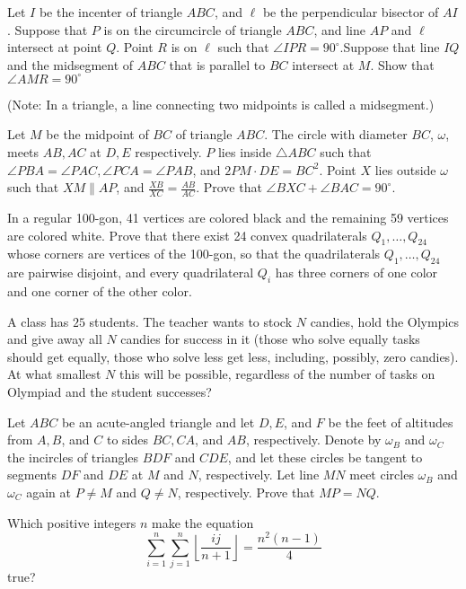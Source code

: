 \documentclass[11pt]{scrartcl}
\begin{document}
\begin{problem}[908587245178389]
Let $I$ be the incenter of triangle $ABC$, and $\ell$ be the perpendicular bisector of $AI$. Suppose that $P$ is on the circumcircle of triangle $ABC$, and line $AP$ and $\ell$ intersect at point $Q$. Point $R$ is on $\ell$ such that $\angle IPR = 90^{\circ}$.Suppose that line $IQ$ and the midsegment of $ABC$ that is parallel to $BC$ intersect at $M$. Show that $\angle AMR = 90^{\circ}$

(Note: In a triangle, a line connecting two midpoints is called a midsegment.)
\end{problem}
\begin{problem}[591652153716935]
	Let $M$ be the midpoint of $BC$ of triangle $ABC$. The circle with diameter $BC$, $\omega$, meets $AB,AC$ at $D,E$ respectively. $P$ lies inside $\triangle ABC$ such that $\angle PBA=\angle PAC, \angle PCA=\angle PAB$, and $2PM\cdot DE=BC^2$. Point $X$ lies outside $\omega$ such that $XM\parallel AP$, and $\frac{XB}{XC}=\frac{AB}{AC}$. Prove that $\angle BXC +\angle BAC=90^{\circ}$.
\end{problem}
\begin{problem}[2749225075653830789]
	In a regular 100-gon, 41 vertices are colored black and the remaining 59 vertices are colored white. Prove that there exist 24 convex quadrilaterals $Q_{1}, \ldots, Q_{24}$ whose corners are vertices of the 100-gon, so that
the quadrilaterals $Q_{1}, \ldots, Q_{24}$ are pairwise disjoint, and
every quadrilateral $Q_{i}$ has three corners of one color and one corner of the other color.
\end{problem}
\begin{problem}[458902414604417]
	A class has $25$ students. The teacher wants to stock $N$ candies, hold the Olympics and give away all $N$ candies for success in it (those who solve equally tasks should get equally, those who solve less get less, including, possibly, zero candies). At what smallest $N$ this will be possible, regardless of the number of tasks on Olympiad and the student successes?
\end{problem}
\begin{problem}[57940096937913]
Let $ABC$ be an acute-angled triangle and let $D, E$, and $F$ be the feet of altitudes from $A, B$, and $C$ to sides $BC, CA$, and $AB$, respectively. Denote by $\omega_B$ and $\omega_C$ the incircles of triangles $BDF$ and $CDE$, and let these circles be tangent to segments $DF$ and $DE$ at $M$ and $N$, respectively. Let line $MN$ meet circles $\omega_B$ and $\omega_C$ again at $P \ne M$ and $Q \ne N$, respectively. Prove that $MP = NQ$.
\end{problem}
\begin{problem}[819328919046836]
Which positive integers $n$ make the equation\[\sum_{i=1}^n \sum_{j=1}^n \left\lfloor \frac{ij}{n+1} \right\rfloor=\frac{n^2(n-1)}{4}\]true?
\end{problem}
\end{document}
